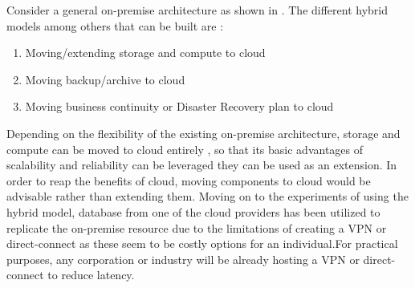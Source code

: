 \documentclass[journal]{hybrid-cloud}
\begin{document}
Consider a general on-premise architecture as shown in . The different hybrid models among others that can be built are :
\begin{enumerate}
	\item Moving/extending storage and compute to cloud
	\item Moving backup/archive to cloud
	\item Moving business continuity or Disaster Recovery plan to cloud
\end{enumerate}

Depending on the flexibility of the existing on-premise architecture, storage and compute can be moved to cloud entirely , so that its basic advantages of scalability and reliability can be leveraged they can be used as an extension. In order to reap the benefits of cloud, moving components to cloud would be advisable rather than extending them. Moving on to the experiments of using the hybrid model, database from one of the cloud providers has been utilized to replicate the on-premise resource due to the limitations of creating a VPN or direct-connect as these seem to be costly options for an individual.For practical purposes, any corporation or industry will be already hosting a VPN or direct-connect to reduce latency.
\end{document}

